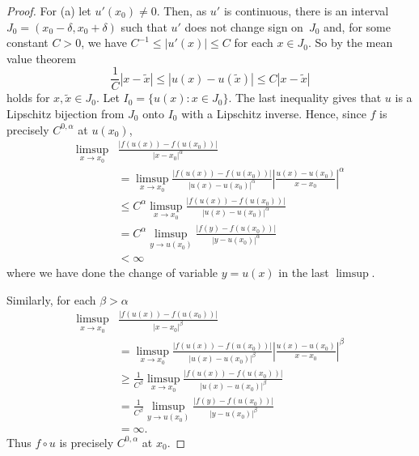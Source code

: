 \documentclass[12pt]{amsart}
\newcommand{\adj}{{precisely }} %
\numberwithin{equation}{section}
\theoremstyle{definition}
\theoremstyle{remark}
\begin{document}
\begin{proof}
    For (a) let $u'(x_0)\ne 0$.  Then, as $u'$ is continuous,
    there is an interval $J_0 = (x_0-\delta , x_0+\delta)$
    such that  $u'$ does not change sign on~$J_0$ and,
    for some constant $C>0$,
    we have $C^{-1} \le |u'(x)| \le C$ for each $x\in J_0$.
    So by the mean value theorem
    $$
    \frac1C |x-\widetilde{x}| \le |u(x)-u(\widetilde{x})|
     \le C |x-\widetilde{x}|
    $$
     holds for $x,\widetilde{x}\in J_0$. 
     Let $I_0 =\{ u(x): x\in J_0\}$. %
     The last inequality gives that
     $u$ is a Lipschitz bijection from $J_0$ onto $I_0$
     with a Lipschitz inverse.       
Hence, since 
$f$ is \adj  $C^{0,\alpha}$ at $u(x_0)$,
\begin{align*}
\limsup_{x\to x_0}&\frac{|f(u(x))- f(u(x_0))|}{|x-x_0|^\alpha}
\\
&=
\limsup_{x\to x_0} \frac{|f(u(x))- f(u(x_0))|}{|u(x)-u(x_0)|^\alpha} 
\left| \frac{u(x)-u(x_0)}{x-x_0}    \right|^\alpha
\\
&\le C^\alpha \limsup_{x\to x_0} \frac{|f(u(x))- f(u(x_0))|}{|u(x)-u(x_0)|^\alpha}
\\
&= C^\alpha \limsup_{y\to u(x_0)} \frac{|f(y)- f(u(x_0))|}{|y-u(x_0)|^\alpha}
\\ 
&< \infty 
\end{align*}
where we have done the change of variable $y=u(x)$ in the last $\limsup$.


Similarly, for each $\beta>\alpha$ 
\begin{align*}
        \limsup_{x\to x_0} &\frac{|f(u(x))- f(u(x_0))|}{|x-x_0|^\beta} \\
          &=\limsup_{x\to x_0} \frac{|f(u(x))- f(u(x_0))|}{|u(x)-u(x_0)|^\beta} 
             \left| \frac{u(x)-u(x_0)}{x-x_0}    \right|^\beta\\
          &\ge \frac1{C^\beta} \limsup_{x\to x_0} \frac{|f(u(x))- f(u(x_0))|}{|u(x)-u(x_0)|^\beta} \\
          &= \frac1{C^\beta }\limsup_{y\to u(x_0)} \frac{|f(y)- f(u(x_0))|}{|y-u(x_0)|^\beta}\\
&=\infty.
\end{align*}
Thus $f\circ u$ is \adj $C^{0,\alpha}$ at $x_0$.



\end{proof}
\end{document}
